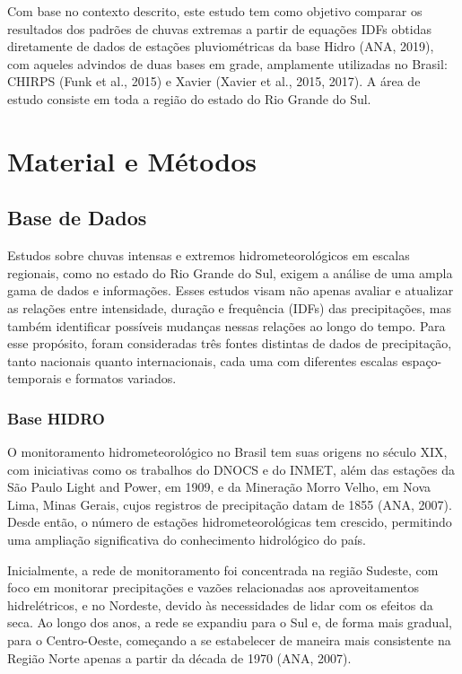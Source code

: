 \documentclass[
]{agujournal2019}
\begin{document}
Com base no contexto descrito, este estudo tem como objetivo comparar os
resultados dos padrões de chuvas extremas a partir de equações IDFs
obtidas diretamente de dados de estações pluviométricas da base Hidro
(ANA, 2019), com aqueles advindos de duas bases em grade, amplamente
utilizadas no Brasil: CHIRPS (Funk et al., 2015) e Xavier (Xavier et
al., 2015, 2017). A área de estudo consiste em toda a região do estado
do Rio Grande do Sul.

\section{Material e Métodos}\label{material-e-muxe9todos}

\justifying

\subsection{Base de Dados}\label{base-de-dados}

Estudos sobre chuvas intensas e extremos hidrometeorológicos em escalas
regionais, como no estado do Rio Grande do Sul, exigem a análise de uma
ampla gama de dados e informações. Esses estudos visam não apenas
avaliar e atualizar as relações entre intensidade, duração e frequência
(IDFs) das precipitações, mas também identificar possíveis mudanças
nessas relações ao longo do tempo. Para esse propósito, foram
consideradas três fontes distintas de dados de precipitação, tanto
nacionais quanto internacionais, cada uma com diferentes escalas
espaço-temporais e formatos variados.

\justifying

\subsubsection{Base HIDRO}\label{base-hidro}

O monitoramento hidrometeorológico no Brasil tem suas origens no século
XIX, com iniciativas como os trabalhos do DNOCS e do INMET, além das
estações da São Paulo Light and Power, em 1909, e da Mineração Morro
Velho, em Nova Lima, Minas Gerais, cujos registros de precipitação datam
de 1855 (ANA, 2007). Desde então, o número de estações
hidrometeorológicas tem crescido, permitindo uma ampliação significativa
do conhecimento hidrológico do país.

Inicialmente, a rede de monitoramento foi concentrada na região Sudeste,
com foco em monitorar precipitações e vazões relacionadas aos
aproveitamentos hidrelétricos, e no Nordeste, devido às necessidades de
lidar com os efeitos da seca. Ao longo dos anos, a rede se expandiu para
o Sul e, de forma mais gradual, para o Centro-Oeste, começando a se
estabelecer de maneira mais consistente na Região Norte apenas a partir
da década de 1970 (ANA, 2007).
\end{document}
